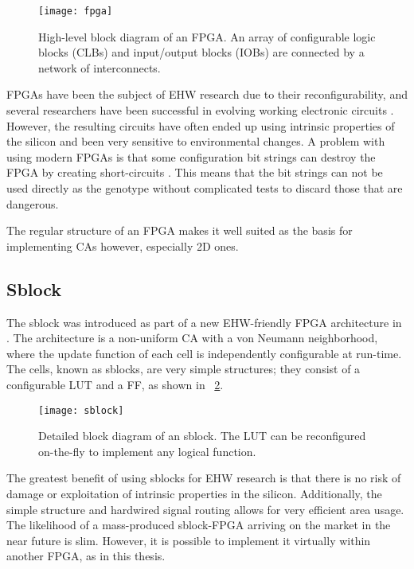 \begin{figure}[!ht]
    \centering
    \texttt{[image: fpga]}
    \caption[FPGA]{
        High-level block diagram of an FPGA.
        An array of configurable logic blocks (CLBs) and input/output blocks (IOBs) are connected by a network of interconnects.
    }
    \label{fig:fpga}
\end{figure}

FPGAs have been the subject of EHW research due to their reconfigurability, and several researchers have been successful in evolving working electronic circuits \cite{huelsbergen1998evolution, thompson1997evolved}.
However, the resulting circuits have often ended up using intrinsic properties of the silicon and been very sensitive to environmental changes.
A problem with using modern FPGAs is that some configuration bit strings can destroy the FPGA by creating short-circuits \cite{xapp151, ug380}.
This means that the bit strings can not be used directly as the genotype without complicated tests to discard those that are dangerous.

The regular structure of an FPGA makes it well suited as the basis for implementing CAs however, especially 2D ones.

\subsection{Sblock}
\label{sec:sblock}

The sblock was introduced as part of a new EHW-friendly FPGA architecture in \cite{haddow2000sblock}.
The architecture is a non-uniform CA with a von Neumann neighborhood, where the update function of each cell is independently configurable at run-time.
The cells, known as sblocks, are very simple structures; they consist of a configurable LUT and a FF, as shown in \figurename~\ref{fig:sblock}.

\begin{figure}[!ht]
    \centering
    \texttt{[image: sblock]}
    \caption[Sblock]{
        Detailed block diagram of an sblock.
        The LUT can be reconfigured on-the-fly to implement any logical function.
    }
    \label{fig:sblock}
\end{figure}

The greatest benefit of using sblocks for EHW research is that there is no risk of damage or exploitation of intrinsic properties in the silicon.
Additionally, the simple structure and hardwired signal routing allows for very efficient area usage.
The likelihood of a mass-produced sblock-FPGA arriving on the market in the near future is slim.
However, it is possible to implement it virtually within another FPGA, as in this thesis.

